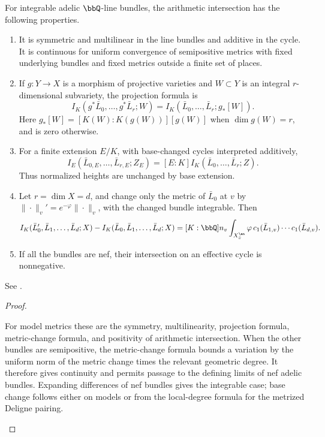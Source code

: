 \begin{theorem}[label=\labelNFM{thm:fundamental-properties-of-arithmetic-intersection}, status=draft, tag=0000000]
	\begin{latexmathchange}
	For integrable adelic $\bbQ$-line bundles, the arithmetic intersection has the following properties.
	\begin{enumerate}
		\item It is symmetric and multilinear in the line bundles and additive in the cycle.
		      It is continuous for uniform convergence of semipositive metrics with fixed underlying bundles and fixed metrics outside a finite set of places.
		\item If $g:Y \to X$ is a morphism of projective varieties and $W \subset Y$ is an integral $r$-dimensional subvariety, the projection formula is
		      \[ I_K(g^*\bar L_0,\ldots,g^*\bar L_r;W) = I_K(\bar L_0,\ldots,\bar L_r;g_*[W]). \]
		      Here $g_*[W] = [K(W):K(g(W))][g(W)]$ when $\dim g(W) = r$, and is zero otherwise.
		\item For a finite extension $E/K$, with base-changed cycles interpreted additively,
		      \[ I_E(\bar L_{0,E},\ldots,\bar L_{r,E};Z_E) = [E:K]I_K(\bar L_0,\ldots,\bar L_r;Z). \]
		      Thus normalized heights are unchanged by base extension.
		\item Let $r = \dim X = d$, and change only the metric of $\bar L_0$ at $v$ by $\|\cdot\|_v' = e^{-\varphi}\|\cdot\|_v$, with the changed bundle integrable.
		      Then
		      \[ I_K(\bar L_0',\bar L_1,\ldots,\bar L_d;X)-I_K(\bar L_0,\bar L_1,\ldots,\bar L_d;X) = [K:\bbQ]n_v\int_{X_{\bar v}^\an}\varphi\,c_1(\bar L_{1,v})\cdots c_1(\bar L_{d,v}). \]
		\item If all the bundles are nef, their intersection on an effective cycle is nonnegative.
	\end{enumerate}
	See \cite[\S\S 4.1--4.4 and Appendix~A.5.3]{Yuan-Zhang-2026-AdelicLineBundles}.
	\end{latexmathchange}
\end{theorem}

\begin{proof}
	\leavevmode\par
	\begin{latexmathchange}
	For model metrics these are the symmetry, multilinearity, projection formula, metric-change formula, and positivity of arithmetic intersection.
	When the other bundles are semipositive, the metric-change formula bounds a variation by the uniform norm of the metric change times the relevant geometric degree.
	It therefore gives continuity and permits passage to the defining limits of nef adelic bundles.
	Expanding differences of nef bundles gives the integrable case; base change follows either on models or from the local-degree formula for the metrized Deligne pairing.
	\end{latexmathchange}
\end{proof}

